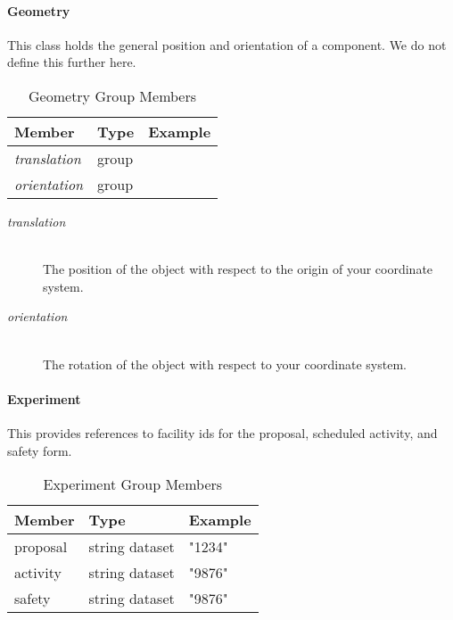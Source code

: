\paragraph{Geometry}
\label{table:geometry}

This class holds the general position and orientation of a component. We do not define this
further here.

\begin{table}[h!]\sffamily \footnotesize
\centering
\caption{Geometry Group Members}
\begin{tabular}{l l l}
\toprule
\bfseries Member     & \bfseries Type & \bfseries Example \\
\midrule

\emph{translation} & group &  \\
\emph{orientation} & group & \\

\bottomrule
\end{tabular}
\end{table}

\begin{description}
\item[\emph{translation}] \hfill \\
{The position of the object with respect to the origin of your coordinate system.}

\item[\emph{orientation}] \hfill \\
{The rotation of the object with respect to your coordinate system.}
\end{description}

\paragraph{Experiment}

This provides references to facility ids for the proposal, scheduled
activity, and safety form.

\begin{table}[h!]\sffamily \footnotesize
\centering
\caption{Experiment Group Members}
\begin{tabular}{l l l}
\toprule
\bfseries Member     & \bfseries Type & \bfseries Example \\
\midrule
proposal & string dataset &  "1234" \\
activity & string dataset &  "9876" \\
safety & string dataset &  "9876" \\
\bottomrule
\end{tabular}
\label{table:experiment}
\end{table}

